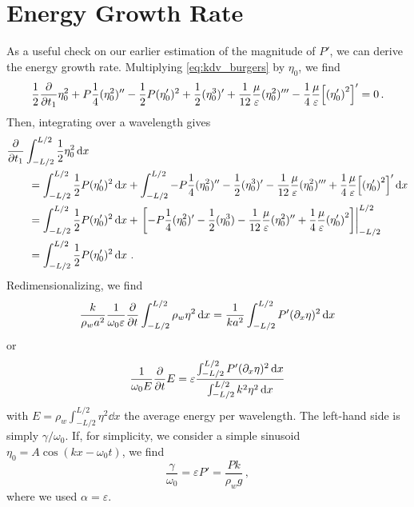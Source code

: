 \documentclass{jfm}
\renewcommand*{\epsilon}{\varepsilon}
\begin{document}
\appendix

\section{Energy Growth Rate \label{sec:energy_growth_rate}}
As a useful check on our earlier estimation of the magnitude of $P'$, we
can derive the energy growth rate.
Multiplying \cref{eq:kdv_burgers} by $\eta_0$, we find
\begin{equation}
  \frac{1}{2} \pdv{t_1} \eta_0^2 + P
  \frac{1}{4} (\eta_0^2)'' - \frac{1}{2} P
  (\eta_0')^2 + \frac{1}{2} (\eta_0^3)' + \frac{1}{12}
  \frac{\mu}{\epsilon} (\eta_0^2)''' - \frac{1}{4} \frac{\mu}{\epsilon}
  \bqty{\pqty{\eta_0'}^2}' = 0 \,.
\end{equation}
Then, integrating over a wavelength gives
\begin{equation}
  \begin{split}
  &\pdv{t_1} \int_{-L/2}^{L/2} \frac{1}{2} \eta_0^2 \dd{x} \\
  &\qquad= \int_{-L/2}^{L/2} \frac{1}{2} P
    (\eta_0')^2 \dd{x} + \int_{-L/2}^{L/2} -P
    \frac{1}{4} (\eta_0^2)'' - \frac{1}{2}
    (\eta_0^3)' - \frac{1}{12} \frac{\mu}{\epsilon} (\eta_0^2)''' +
    \frac{1}{4} \frac{\mu}{\epsilon} \bqty{\pqty{\eta_0'}^2}' \dd{x}
  \\
  &\qquad=
  \int_{-L/2}^{L/2} \frac{1}{2} P
  (\eta_0')^2 \dd{x} + \eval{\bqty{-P
      \frac{1}{4} (\eta_0^2)'  - \frac{1}{2} (\eta_0^3) - \frac{1}{12}
      \frac{\mu}{\epsilon} (\eta_0^2)'' + \frac{1}{4}
      \frac{\mu}{\epsilon} \pqty{\eta_0'}^2}}_{-L/2}^{L/2}
  \\
  &\qquad=
  \int_{-L/2}^{L/2} \frac{1}{2} P (\eta_0')^2 \dd{x} \,.
  \end{split}
\end{equation}
Redimensionalizing, we find
\begin{equation}
  \frac{k}{\rho_w a^2} \frac{1}{\omega_0 \epsilon} \pdv{t} \int_{-L/2}^{L/2}
  \rho_w \eta^2 \dd{x} = \frac{1}{k a^2} \int_{-L/2}^{L/2} P'
  (\partial_x \eta)^2 \dd{x}
\end{equation}
or
\begin{equation}
  \frac{1}{\omega_0 E} \pdv{t} E =
  \epsilon
  \frac{
    \int_{-L/2}^{L/2} P' (\partial_x \eta)^2 \dd{x}
  }
  {
    \int_{-L/2}^{L/2} k^2 \eta^2 \dd{x}
  }
\end{equation}
with $E = \rho_w \int_{-L/2}^{L/2} \eta^2 \dd{x}$ the average
energy per wavelength.
The left-hand side is simply $\gamma/\omega_0$.
If, for simplicity, we consider a simple sinusoid $\eta_0 = A \cos(k x -
\omega_0 t)$, we find
\begin{equation}
  \frac{\gamma}{\omega_0} = \epsilon P' = \frac{P k}{\rho_w g} \,,
\end{equation}
where we used $\alpha = \epsilon$.



\end{document}

